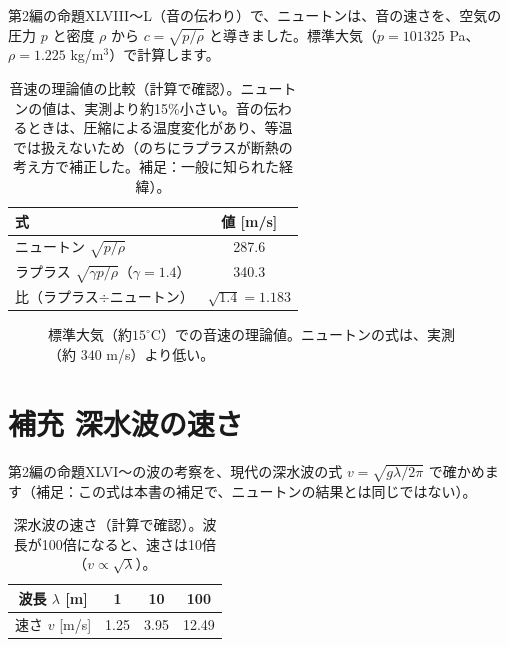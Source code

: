\documentclass[a4paper,11pt,openany]{ltjsbook}
\begin{document}
第2編の命題XLVIII〜L（音の伝わり）で、ニュートンは、音の速さを、空気の圧力 $p$ と密度 $\rho$ から $c=\sqrt{p/\rho}$ と導きました。標準大気（$p=101325$ Pa、$\rho=1.225$ kg/m$^3$）で計算します。

\begin{table}[htbp]
\centering
\begin{tabular}{lc}
\toprule
式 & 値 [m/s]\\
\midrule
ニュートン $\sqrt{p/\rho}$ & 287.6\\
ラプラス $\sqrt{\gamma p/\rho}$（$\gamma=1.4$） & 340.3\\
比（ラプラス$\div$ニュートン） & $\sqrt{1.4}=1.183$\\
\bottomrule
\end{tabular}
\caption{音速の理論値の比較（計算で確認）。ニュートンの値は、実測より約15\%小さい。音の伝わるときは、圧縮による温度変化があり、等温では扱えないため（のちにラプラスが断熱の考え方で補正した。補足：一般に知られた経緯）。}
\end{table}

\begin{figure}[htbp]
\centering
{}
\caption{標準大気（約$15^\circ$C）での音速の理論値。ニュートンの式は、実測（約 $340$ m/s）より低い。}
\end{figure}

\section{補充 深水波の速さ}

第2編の命題XLVI〜の波の考察を、現代の深水波の式 $v=\sqrt{g\lambda/2\pi}$ で確かめます（補足：この式は本書の補足で、ニュートンの結果とは同じではない）。

\begin{table}[htbp]
\centering
\begin{tabular}{c|ccc}
\toprule
波長 $\lambda$ [m] & 1 & 10 & 100\\
\midrule
速さ $v$ [m/s] & 1.25 & 3.95 & 12.49\\
\bottomrule
\end{tabular}
\caption{深水波の速さ（計算で確認）。波長が100倍になると、速さは10倍（$v\propto\sqrt\lambda$）。}
\end{table}
\end{document}
